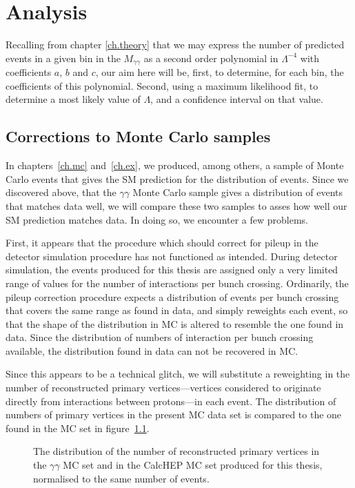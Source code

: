 \chapter{Analysis}\label{ch.an}

Recalling from chapter \ref{ch.theory} that we may express the number of predicted events in a given bin in the $M_{\gamma\gamma}$ as a second order polynomial in $\Lambda^{-4}$ with coefficients $a$, $b$ and $c$, our aim here will be, first, to determine, for each bin, the coefficients of this polynomial. Second, using a maximum likelihood fit, to determine a most likely value of $\Lambda$, and a confidence interval on that value.

\section{Corrections to Monte Carlo samples}

In chapters~\ref{ch.mc} and~\ref{ch.ex}, we produced, among others, a sample of Monte Carlo events that gives the SM prediction for the distribution of events. Since we discovered above, that the \atlas{} $\gamma\gamma$ Monte Carlo sample gives a distribution of events that matches data well, we will compare these two samples to asses how well our SM prediction matches data. In doing so, we encounter a few problems.

First, it appears that the procedure which should correct for pileup in the detector simulation procedure has not functioned as intended. During detector simulation, the events produced for this thesis are assigned only a very limited range of values for the number of interactions per bunch crossing. Ordinarily, the pileup correction procedure expects a distribution of events per bunch crossing that covers the same range as found in data, and simply reweights each event, so that the shape of the distribution in MC is altered to resemble the one found in data. Since the distribution of numbers of interaction per bunch crossing available, the distribution found in data can not be recovered in MC.

Since this appears to be a technical glitch, we will substitute a reweighting in the number of reconstructed primary vertices---vertices considered to originate directly from interactions between protons---in each event. The distribution of numbers of primary vertices in the present MC data set is compared to the one found in the \atlas{} MC set in figure~\ref{pvnnone}.

\begin{figure}[htp]
\begin{minipage}[b]{.69\textwidth}
\begin{infilsf} \tiny

\end{infilsf}
\end{minipage}
\begin{minipage}[b]{.3\textwidth}
\caption{The distribution of the number of reconstructed primary vertices in the \atlas{} $\gamma\gamma$ MC set and in the CalcHEP MC set produced for this thesis, normalised to the same number of events.}\label{pvnnone}
\end{minipage}
\end{figure}


